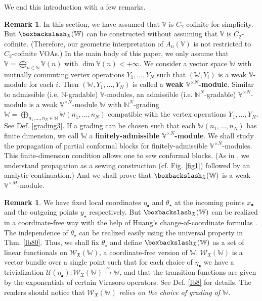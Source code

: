 \documentclass[11pt,b5paper,notitlepage]{article}
\theoremstyle{definition}
\newtheorem{rem}[df]{Remark}
\theoremstyle{plain}
\newcommand{\mc}{\mathcal}
\newcommand{\scr}{\mathscr}
\newcommand{\blt}{\bullet}
\newcommand{\Vbb}{\mathbb V}
\newcommand{\Wbb}{\mathbb W}
\newcommand{\Nbb}{\mathbb N}
\newcommand{\<}{\left\langle}
\renewcommand{\>}{\right\rangle}
\newcommand{\fx}{\mathfrak{X}}
\newcommand{\bbs}{\boxbackslash}
\numberwithin{equation}{section}
\begin{document}
We end this introduction with a few remarks.

\begin{rem}
In this section, we have assumed that $\Vbb$ is $C_2$-cofinite for simplicity. But $\bbs_\fx(\Wbb)$ can be constructed without assuming that $\Vbb$ is $C_2$-cofinite. (Therefore, our geometric interpretation of $A_n(\Vbb)$ is not restricted to $C_2$-cofinite VOAs.) In the main body of this paper, we only assume that $\Vbb=\bigoplus_{n\in\Nbb}\Vbb(n)$ with $\dim \Vbb(n)<+\infty$. We consider a vector space $\Wbb$ with mutually commuting vertex operations $Y_1,\dots,Y_N$ such that $(\Wbb,Y_i)$ is a weak $\Vbb$-module for each $i$. Then $(\Wbb, Y_1,\dots,Y_N)$ is called a \textbf{weak $\Vbb^{\times N}$-module}. Similar to admissible (i.e. $\Nbb$-gradable) $\Vbb$-modules, an admissible (i.e. $\Nbb^N$-gradable) $\Vbb^{\times N}$-module is a weak $\Vbb^{\times N}$-module $\Wbb$ with $\Nbb^N$-grading $\Wbb=\bigoplus_{n_1,\dots,n_N\in\Nbb}\Wbb(n_1,\dots,n_N)$ compatible with the vertex operations $Y_1,\dots,Y_N$. See Def. \ref{grading3}. If a grading can be chosen such that each $\Wbb(n_1,\dots,n_N)$ has finite dimension, we call $\Wbb$ a \textbf{finitely-admissible $\Vbb^{\times N}$-module}. We shall study the propagation of partial conformal blocks for finitely-admissible $\Vbb^{\times N}$-modules. This finite-dimension condition allows one to sew conformal blocks. (As in \cite{Gui-propagation}, we understand propagation as a sewing construction (cf. Fig. \ref{fig1}) followed by an analytic continuation.) And we shall prove that $\bbs_\fx(\Wbb)$ is a weak $\Vbb^{\times M}$-module. 
\end{rem}

\begin{rem}
We have fixed local coordinates $\eta_\blt$ and $\theta_\star$ at the incoming points $x_\blt$ and the outgoing points $y_\star$ respectively. But $\bbs_\fx(\Wbb)$ can be realized in a coordinate-free way with the help of Huang's change-of-coordinate formulas \cite{Hua97}. The independence of $\theta_\star$ can be realized easily using the universal property in Thm. \ref{lb80}. Thus, we shall fix $\theta_\star$ and define $\bbs_\fx(\Wbb)$ as a set of linear functionals on $\scr W_\fx(\Wbb)$, a coordinate-free version of $\Wbb$. $\scr W_\fx(\Wbb)$ is a vector bundle over a single point such that for each choice of $\eta_\blt$ we have a trivialization $\mc U(\eta_\blt):\scr W_\fx(\Wbb)\xrightarrow{\simeq}\Wbb$, and that the transition functions are given by the exponentials of certain Virasoro operators. See Def. \ref{lb8} for details. The readers should notice that $\scr W_\fx(\Wbb)$ \emph{relies on the choice of grading of $\Wbb$}.
\end{rem}
\end{document}
